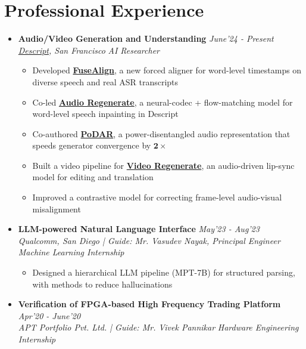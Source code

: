 \documentclass[10pt,letterpaper,sans]{moderncv}
\providecommand{\sl}{\slshape}
\begin{document}
\section{Professional Experience}
\begin{itemize}
\item \textbf{Audio/Video Generation and Understanding} \hfill{\sl June'24 - Present}\\
\textit{\href{https://www.descript.com/research}{Descript}, San Francisco} \hfill {\sl AI Researcher}\\
\vspace{-8pt}
\begin{itemize}
\item Developed \href{https://descriptinc.github.io/fusealign/}{\textbf{FuseAlign}}, a new forced aligner for word-level timestamps on diverse speech and real ASR transcripts
\item Co-led \href{https://descriptinc.github.io/uvm-v2/}{\textbf{Audio Regenerate}}, a neural-codec + flow-matching model for word-level speech inpainting in Descript
\item Co-authored \href{https://arxiv.org/abs/2605.10084}{\textbf{PoDAR}}, a power-disentangled audio representation that speeds generator convergence by $\mathbf{2\times}$
\item Built a video pipeline for \href{https://descriptinc.github.io/video-regenerate/}{\textbf{Video Regenerate}}, an audio-driven lip-sync model for editing and translation
\item Improved a contrastive model for correcting frame-level audio-visual misalignment
\end{itemize}
\item \textbf{LLM-powered Natural Language Interface} \hfill{\sl May'23 - Aug'23}\\
\textit{Qualcomm, San Diego | Guide: Mr. Vasudev Nayak, Principal Engineer} \hfill {\sl Machine Learning Internship}\\
\vspace{-8pt}
\begin{itemize}
\item Designed a hierarchical LLM pipeline (MPT-7B) for structured parsing, with methods to reduce hallucinations
\end{itemize}
\item \textbf{Verification of FPGA-based High Frequency Trading Platform} \hfill{\sl Apr'20 - June'20}\\
\textit{APT Portfolio Pvt. Ltd. | Guide: Mr. Vivek Pannikar} \hfill {\sl Hardware Engineering Internship}\\

\end{itemize}
\end{document}

